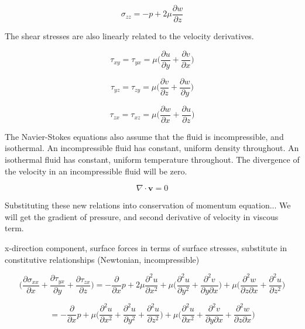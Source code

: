 \documentclass[twocolumn,12pth]{article}
\begin{document}
\begin{equation*}
\sigma_{zz} = -p + 2\mu\frac{\partial{w}}{\partial{z}}
\end{equation*}

The shear stresses are also linearly related to the velocity derivatives.

\begin{equation}
\tau_{xy} = \tau_{yx} = \mu\bigg(\frac{\partial{u}}{\partial{y}} + \frac{\partial{v}}{\partial{x}}\bigg)
\end{equation}

\begin{equation*}
\tau_{yz} = \tau_{zy} = \mu\bigg(\frac{\partial{v}}{\partial{z}} + \frac{\partial{w}}{\partial{y}}\bigg)
\end{equation*}

\begin{equation*}
\tau_{zx} = \tau_{xz} = \mu\bigg(\frac{\partial{w}}{\partial{x}} + \frac{\partial{u}}{\partial{z}}\bigg)
\end{equation*}

The Navier-Stokes equations also assume that the fluid is incompressible, and isothermal.
An incompressible fluid has constant, uniform density throughout.
An isothermal fluid has constant, uniform temperature throughout.
The divergence of the velocity in an incompressible fluid will be zero.

\begin{equation}
\nabla \cdot \mathbf{v} = 0
\end{equation}

Substituting these new relations into conservation of momentum equation...
We will get the gradient of pressure, and second derivative of velocity in viscous term.

x-direction component, surface forces in terms of surface stresses, substitute in constitutive relationships (Newtonian, incompressible)

\begin{equation}
\bigg(\frac{\partial{\sigma_{xx}}}{\partial{x}} + \frac{\partial{\tau_{yx}}}{\partial{y}} + \frac{\partial{\tau_{zx}}}{\partial{z}} \bigg) = -\frac{\partial}{\partial{x}}p + 2\mu\frac{\partial^2u}{\partial{x}^2} + \mu\bigg(\frac{\partial^2u}{\partial{y}^2} + \frac{\partial^2v}{\partial{y}\partial{x}} \bigg) + \mu\bigg(\frac{\partial^2w}{\partial{z}\partial{x}} + \frac{\partial^2u}{\partial{z}^2} \bigg)
\end{equation}

\begin{equation}
= -\frac{\partial}{\partial{x}}p + \mu \bigg( \frac{\partial^2u}{\partial{x}^2} + \frac{\partial^2u}{\partial{y}^2} + \frac{\partial^2u}{\partial{z}^2} \bigg) + \mu \bigg( \frac{\partial^2u}{\partial{x}^2} + \frac{\partial^2v}{\partial{y}\partial{x}} + \frac{\partial^2w}{\partial{z}\partial{x}}  \bigg)
\end{equation}
\end{document}
